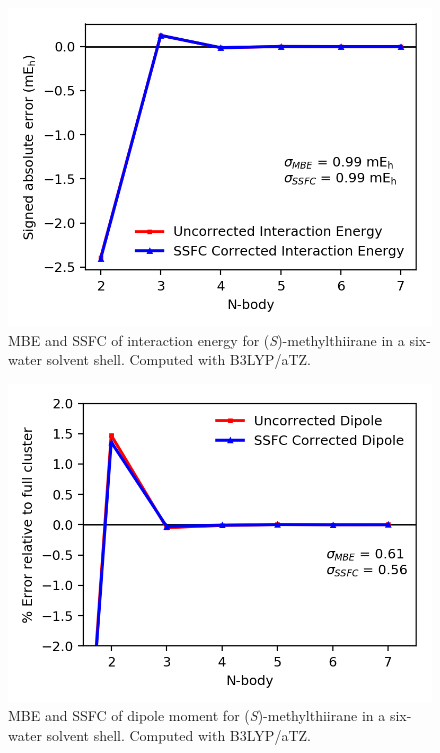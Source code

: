     \begin{figure}
        \centering
        \includegraphics[scale=0.75]{p1/graphs/si/metthi_6_tz_int.png}
        \caption{MBE and SSFC of interaction energy for (\textit{S})-methylthiirane in a six-water solvent shell. Computed with B3LYP/aTZ.}
        \label{metthi_6_tz_int}
    \end{figure}
    \begin{figure}
        \centering
        \includegraphics[scale=0.75]{p1/graphs/si/metthi_6_tz_dip.png}
        \caption{MBE and SSFC of dipole moment for (\textit{S})-methylthiirane in a six-water solvent shell. Computed with B3LYP/aTZ.}
        \label{metthi_6_tz_dip}
    \end{figure}

